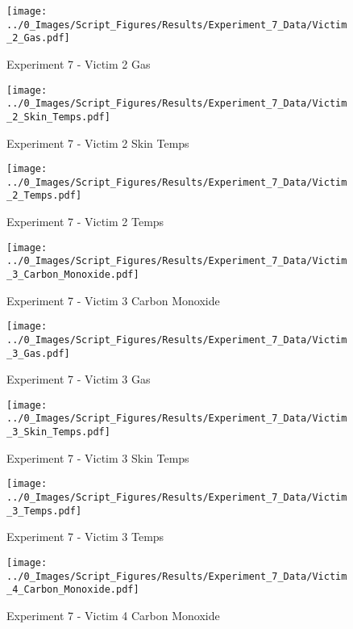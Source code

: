 	\clearpage

	\begin{figure}[H]
		\centering
		\texttt{[image: ../0\_Images/Script\_Figures/Results/Experiment\_7\_Data/Victim\_2\_Gas.pdf]}
		\caption[]{Experiment 7 - Victim 2 Gas}
	\end{figure}
 

	\begin{figure}[H]
		\centering
		\texttt{[image: ../0\_Images/Script\_Figures/Results/Experiment\_7\_Data/Victim\_2\_Skin\_Temps.pdf]}
		\caption[]{Experiment 7 - Victim 2 Skin Temps}
	\end{figure}
 
	\clearpage

	\begin{figure}[H]
		\centering
		\texttt{[image: ../0\_Images/Script\_Figures/Results/Experiment\_7\_Data/Victim\_2\_Temps.pdf]}
		\caption[]{Experiment 7 - Victim 2 Temps}
	\end{figure}
 

	\begin{figure}[H]
		\centering
		\texttt{[image: ../0\_Images/Script\_Figures/Results/Experiment\_7\_Data/Victim\_3\_Carbon\_Monoxide.pdf]}
		\caption[]{Experiment 7 - Victim 3 Carbon Monoxide}
	\end{figure}
 
	\clearpage

	\begin{figure}[H]
		\centering
		\texttt{[image: ../0\_Images/Script\_Figures/Results/Experiment\_7\_Data/Victim\_3\_Gas.pdf]}
		\caption[]{Experiment 7 - Victim 3 Gas}
	\end{figure}
 

	\begin{figure}[H]
		\centering
		\texttt{[image: ../0\_Images/Script\_Figures/Results/Experiment\_7\_Data/Victim\_3\_Skin\_Temps.pdf]}
		\caption[]{Experiment 7 - Victim 3 Skin Temps}
	\end{figure}
 
	\clearpage

	\begin{figure}[H]
		\centering
		\texttt{[image: ../0\_Images/Script\_Figures/Results/Experiment\_7\_Data/Victim\_3\_Temps.pdf]}
		\caption[]{Experiment 7 - Victim 3 Temps}
	\end{figure}
 

	\begin{figure}[H]
		\centering
		\texttt{[image: ../0\_Images/Script\_Figures/Results/Experiment\_7\_Data/Victim\_4\_Carbon\_Monoxide.pdf]}
		\caption[]{Experiment 7 - Victim 4 Carbon Monoxide}
	\end{figure}
 
